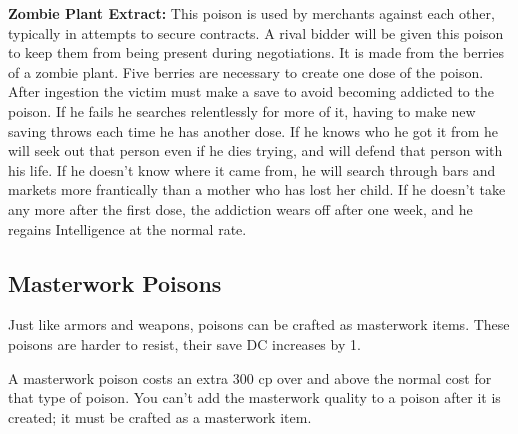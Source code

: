 \textbf{Zombie Plant Extract:} This poison is used by merchants against each other, typically in attempts to secure contracts. A rival bidder will be given this poison to keep them from being present during negotiations. It is made from the berries of a zombie plant. Five berries are necessary to create one dose of the poison. After ingestion the victim must make a save to avoid becoming addicted to the poison. If he fails he searches relentlessly for more of it, having to make new saving throws each time he has another dose. If he knows who he got it from he will seek out that person even if he dies trying, and will defend that person with his life. If he doesn't know where it came from, he will search through bars and markets more frantically than a mother who has lost her child. If he doesn't take any more after the first dose, the addiction wears off after one week, and he regains Intelligence at the normal rate.

\subsection{Masterwork Poisons}
Just like armors and weapons, poisons can be crafted as masterwork items. These poisons are harder to resist, their save DC increases by 1.

A masterwork poison costs an extra 300 cp over and above the normal cost for that type of poison. You can't add the masterwork quality to a poison after it is created; it must be crafted as a masterwork item.
